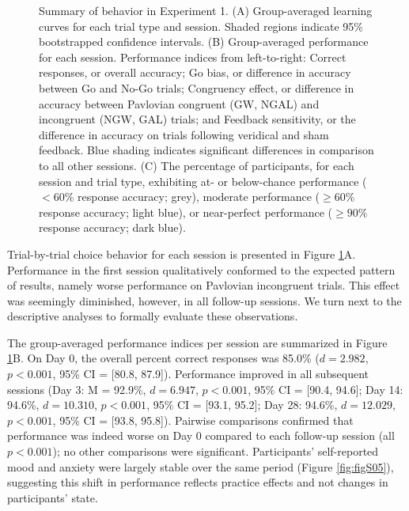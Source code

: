 \documentclass[a4paper,12pt]{article}
\begin{document}
\begin{refsection}[main]
\begin{figure}[hpt]
    \centerline{}
    \caption{Summary of behavior in Experiment 1. (A) Group-averaged learning curves for each trial type and session. Shaded regions indicate 95\% bootstrapped confidence intervals. (B) Group-averaged performance for each session. Performance indices from left-to-right: Correct responses, or overall accuracy; Go bias, or difference in accuracy between Go and No-Go trials; Congruency effect, or difference in accuracy between Pavlovian congruent (GW, NGAL) and incongruent (NGW, GAL) trials; and Feedback sensitivity, or the difference in accuracy on trials following veridical and sham feedback. Blue shading indicates significant differences in comparison to all other sessions. (C) The percentage of participants, for each session and trial type, exhibiting at- or below-chance performance ($< 60\%$ response accuracy; grey), moderate performance ($\geq 60\%$ response accuracy; light blue), or near-perfect performance ($\geq 90\%$ response accuracy; dark blue).}
    \label{fig:exp01_behavior}
\end{figure}

Trial-by-trial choice behavior for each session is presented in Figure \ref{fig:exp01_behavior}A. Performance in the first session qualitatively conformed to the expected pattern of results, namely worse performance on Pavlovian incongruent trials. This effect was seemingly diminished, however, in all follow-up sessions. We turn next to the descriptive analyses to formally evaluate these observations. 

The group-averaged performance indices per session are summarized in Figure \ref{fig:exp01_behavior}B. On Day 0, the overall percent correct responses was 85.0\% ($d = 2.982$, $p < 0.001$, 95\% CI = [80.8, 87.9]). Performance improved in all subsequent sessions (Day 3: M = 92.9\%, $d = 6.947$, $p < 0.001$, 95\% CI = [90.4, 94.6]; Day 14: 94.6\%, $d = 10.310$, $p < 0.001$, 95\% CI = [93.1, 95.2]; Day 28: 94.6\%, $d=12.029$, $p < 0.001$, 95\% CI = [93.8, 95.8]). Pairwise comparisons confirmed that performance was indeed worse on Day 0 compared to each follow-up session (all $p < 0.001$); no other comparisons were significant. Participants' self-reported mood and anxiety were largely stable over the same period (Figure \ref{fig:figS05}), suggesting this shift in performance reflects practice effects and not changes in participants' state. 


\end{refsection}
\end{document}
